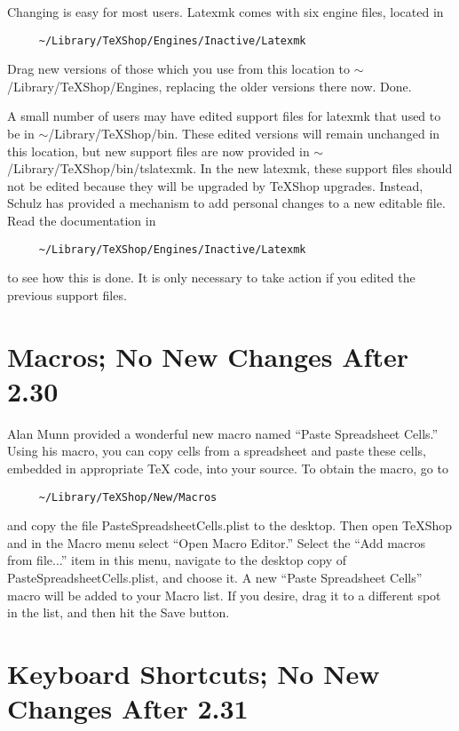 \documentclass[11pt, oneside]{amsart}
\begin{document}
Changing is easy for most users. Latexmk comes with six engine files, located in 
\begin{verbatim}
     ~/Library/TeXShop/Engines/Inactive/Latexmk
\end{verbatim}
Drag new versions of those which you use from this location to $\sim$/Library/TeXShop/Engines, replacing the older versions there now. Done.

A small number of users may have edited support files  for latexmk that used to be in $\sim$/Library/TeXShop/bin. These edited versions will remain unchanged in this location, but new support files are now provided in $\sim$/Library/TeXShop/bin/tslatexmk. In the new latexmk, these support files should not be edited because they will be upgraded by TeXShop upgrades. Instead, Schulz has provided a mechanism to add personal changes to a new editable file. Read the documentation in 
\begin{verbatim}
     ~/Library/TeXShop/Engines/Inactive/Latexmk
\end{verbatim}
to see how this is done. It is only necessary to take action if you edited the previous support files.

\section{Macros; No New Changes After 2.30}

Alan Munn provided a wonderful new macro named ``Paste Spreadsheet Cells.'' Using his macro, you can copy cells from a spreadsheet and paste these cells, embedded in appropriate TeX code, into your source. To obtain the macro, go to
\begin{verbatim}
     ~/Library/TeXShop/New/Macros
\end{verbatim}
and copy the file PasteSpreadsheetCells.plist to the desktop. Then open TeXShop and in the Macro menu select ``Open Macro Editor.'' Select the ``Add macros from file...'' item in this menu, navigate to the desktop copy of PasteSpreadsheetCells.plist, and choose it. A new ``Paste Spreadsheet Cells'' macro will be added to your Macro list. If you desire, drag it to a different spot in the list, and then hit the Save button.

\section{Keyboard Shortcuts; No New Changes After 2.31}
\end{document}
